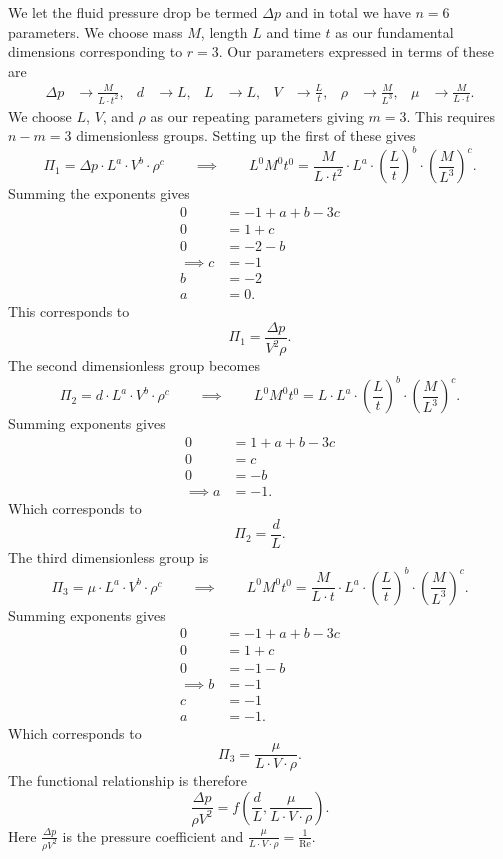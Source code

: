 \begin{derivation}
  We let the fluid pressure drop be termed $\Delta p$ and in total we have $n = 6$ parameters.
  We choose mass $M$, length $L$ and time $t$ as our fundamental dimensions corresponding to $r = 3$.
  Our parameters expressed in terms of these are
  \begin{align*}
    \Delta p &\to \frac{M}{L \cdot t^2}, & d &\to L, & L &\to L, & V &\to \frac{L}{t}, & \rho &\to \frac{M}{L^3}, & \mu &\to \frac{M}{L \cdot t}
  .\end{align*}
  We choose $L$, $V$, and $\rho$ as our repeating parameters giving $m = 3$.
  This requires $n - m = 3$ dimensionless groups.
  Setting up the first of these gives
  \[ 
    \Pi_1 = \Delta p \cdot L^{a} \cdot V^{b} \cdot \rho^{c} \qquad \implies \qquad L^{0} M ^{0} t ^{0} = \frac{M}{L \cdot t^2} \cdot L^{a} \cdot \left( \frac{L}{t} \right)^{b} \cdot \left( \frac{M}{L^3} \right)^{c}
  .\]
  Summing the exponents gives
  \begin{align*}
    0 &= -1 + a + b - 3c \\
    0 &= 1 + c \\
    0 &= -2 - b \\
    \implies c &= -1 \\
    b &= -2 \\
    a &= 0
  .\end{align*}
  This corresponds to
  \[ 
  \Pi_1 = \frac{\Delta p}{V^2 \rho}
  .\]
  The second dimensionless group becomes
  \[ 
  \Pi_2 = d \cdot L^{a} \cdot V^{b} \cdot \rho^{c} \qquad \implies \qquad L^{0} M^{0} t ^{0} = L \cdot L^{a} \cdot \left( \frac{L}{t} \right)^{b} \cdot \left( \frac{M}{L^3} \right)^{c}
  .\]
  Summing exponents gives
  \begin{align*}
    0 &= 1 + a + b - 3c \\
    0 &= c \\
    0 &= -b \\
    \implies a &= -1
  .\end{align*}
  Which corresponds to
  \[ 
  \Pi_2 = \frac{d}{L}
  .\]
  The third dimensionless group is
  \[ 
  \Pi_3 = \mu \cdot L^{a} \cdot V^{b} \cdot \rho^{c} \qquad \implies \qquad L^{0}M^{0} t ^{0} = \frac{M}{L \cdot t} \cdot L^{a} \cdot \left( \frac{L}{t} \right)^{b} \cdot \left( \frac{M}{L^3} \right)^{c}
  .\]
  Summing exponents gives
  \begin{align*}
    0 &= -1 + a + b - 3c \\
    0 &= 1 + c \\
    0 &= -1 - b \\
    \implies b &= -1 \\
    c &= -1 \\
    a &= -1
  .\end{align*}
  Which corresponds to
  \[ 
  \Pi_3 = \frac{\mu}{L \cdot V\cdot \rho}
  .\]
  The functional relationship is therefore
  \[ 
  \frac{\Delta p}{\rho V^2} = f \left( \frac{d}{L}, \frac{\mu}{L \cdot V \cdot \rho} \right)
  .\]
  Here $\frac{\Delta p}{\rho V^2}$ is the pressure coefficient and $\frac{\mu}{L \cdot V \cdot \rho} = \frac{1}{\mathrm{Re}}$.
\end{derivation}

